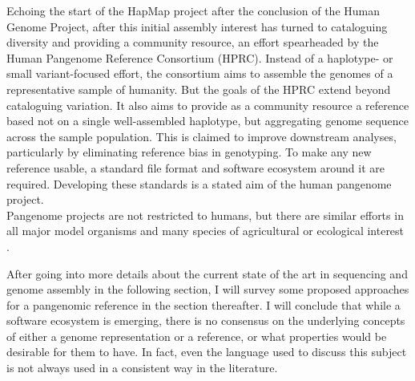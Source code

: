 Echoing the start of the HapMap project after the conclusion of the Human Genome Project, after this initial assembly interest has turned to cataloguing diversity and providing a community resource, an effort spearheaded by the Human Pangenome Reference Consortium (HPRC).
Instead of a haplotype- or small variant-focused effort, the consortium aims to assemble the genomes of a representative sample of humanity\cite{liao23}.
But the goals of the HPRC extend beyond cataloguing variation.
It also aims to provide as a community resource a reference based not on a single well-assembled haplotype, but aggregating genome sequence across the sample population.
This is claimed to improve downstream analyses, particularly by eliminating reference bias in genotyping\cite{paten17, liao23}.
To make any new reference usable, a standard file format and software ecosystem around it are required.
Developing these standards is a stated aim of the human pangenome project\cite{liao23, hprc-workinggroups}.\\
Pangenome projects are not restricted to humans, but there are similar efforts in all major model organisms and many species of agricultural or ecological interest \cite{sun25, yang26, avni26, coronado-zamora22, fang26}.

After going into more details about the current state of the art in sequencing and genome assembly in the following section, I will survey some proposed approaches for a pangenomic reference in the section thereafter.
I will conclude that while a software ecosystem is emerging, there is no consensus on the underlying concepts of either a genome representation or a reference, or what properties would be desirable for them to have.
In fact, even the language used to discuss this subject is not always used in a consistent way in the literature.


